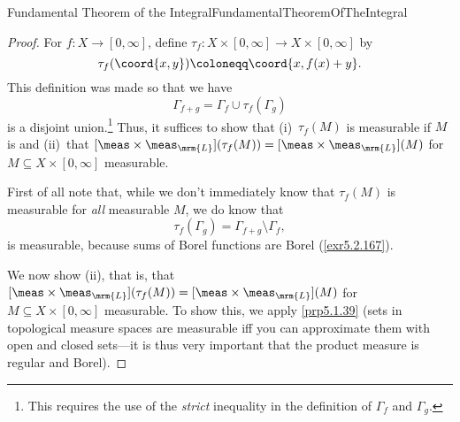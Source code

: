 \begin{thm}{Fundamental Theorem of the Integral}{FundamentalTheoremOfTheIntegral}
\begin{proof}
For $f\colon X\rightarrow [0,\infty ]$, define $\tau _f:X\times [0,\infty ]\rightarrow X\times [0,\infty ]$ by
\begin{equation}
\tau _f(\coord{x,y})\coloneqq \coord{x,f(x)+y}.
\end{equation}
This definition was made so that we have
\begin{equation}\label{Pugh3}
\Gamma _{f+g}=\Gamma _f\cup \tau _f(\Gamma _g)
\end{equation}
is a disjoint union.\footnote{This requires the use of the \emph{strict} inequality in the definition of $\Gamma _f$ and $\Gamma _g$.}  Thus, it suffices to show that (i)~$\tau _f(M)$ is measurable if $M$ is and (ii)~that $[\meas \times \meas _{\mrm{L}}](\tau _f(M))=[\meas \times \meas _{\mrm{L}}](M)$ for $M\subseteq X\times [0,\infty ]$ measurable.

First of all note that, while we don't immediately know that $\tau _f(M)$ is measurable for \emph{all} measurable $M$, we do know that
\begin{equation}
\tau _f(\Gamma _g)=\Gamma _{f+g}\setminus \Gamma _f,
\end{equation}
is measurable, because sums of Borel functions are Borel (\cref{exr5.2.167}).

We now show (ii), that is, that $[\meas \times \meas _{\mrm{L}}](\tau _f(M))=[\meas \times \meas _{\mrm{L}}](M)$ for $M\subseteq X\times [0,\infty ]$ measurable.  To show this, we apply \cref{prp5.1.39} (sets in topological measure spaces are measurable iff you can approximate them with open and closed sets---it is thus very important that the product measure is regular and Borel).


\end{proof}
\end{thm}
